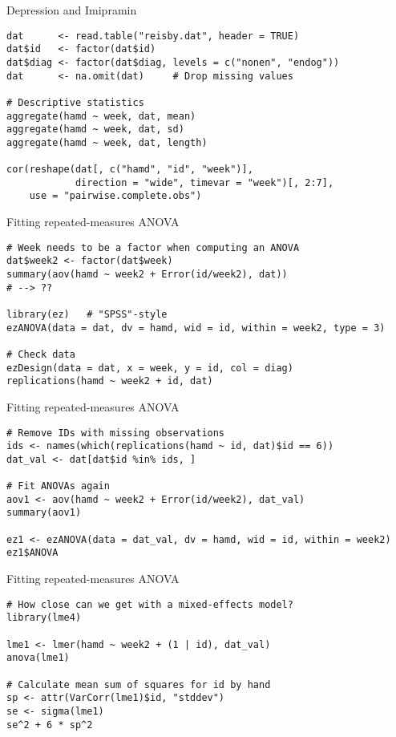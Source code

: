 \documentclass[aspectratio=169]{beamer}
\begin{document}
{

\begin{frame}[fragile]{Depression and Imipramin}
  \begin{lstlisting}
dat      <- read.table("reisby.dat", header = TRUE)
dat$id   <- factor(dat$id)
dat$diag <- factor(dat$diag, levels = c("nonen", "endog"))
dat      <- na.omit(dat)     # Drop missing values

# Descriptive statistics
aggregate(hamd ~ week, dat, mean)
aggregate(hamd ~ week, dat, sd)
aggregate(hamd ~ week, dat, length)

cor(reshape(dat[, c("hamd", "id", "week")], 
            direction = "wide", timevar = "week")[, 2:7],
    use = "pairwise.complete.obs")
  \end{lstlisting}
\end{frame}

\begin{frame}[fragile]{Fitting repeated-measures ANOVA}
  \begin{lstlisting}
# Week needs to be a factor when computing an ANOVA
dat$week2 <- factor(dat$week)
summary(aov(hamd ~ week2 + Error(id/week2), dat))
# --> ?? 

library(ez)   # "SPSS"-style
ezANOVA(data = dat, dv = hamd, wid = id, within = week2, type = 3)

# Check data
ezDesign(data = dat, x = week, y = id, col = diag)
replications(hamd ~ week2 + id, dat)
  \end{lstlisting}
\end{frame}

\begin{frame}[fragile]{Fitting repeated-measures ANOVA}
  \begin{lstlisting}
# Remove IDs with missing observations
ids <- names(which(replications(hamd ~ id, dat)$id == 6))
dat_val <- dat[dat$id %in% ids, ]

# Fit ANOVAs again
aov1 <- aov(hamd ~ week2 + Error(id/week2), dat_val)
summary(aov1)

ez1 <- ezANOVA(data = dat_val, dv = hamd, wid = id, within = week2)
ez1$ANOVA
  \end{lstlisting}
\end{frame}

\begin{frame}[fragile]{Fitting repeated-measures ANOVA}
  \begin{lstlisting}
# How close can we get with a mixed-effects model?
library(lme4)

lme1 <- lmer(hamd ~ week2 + (1 | id), dat_val)
anova(lme1)

# Calculate mean sum of squares for id by hand
sp <- attr(VarCorr(lme1)$id, "stddev")
se <- sigma(lme1)
se^2 + 6 * sp^2
  \end{lstlisting}
\end{frame}

}
\end{document}
